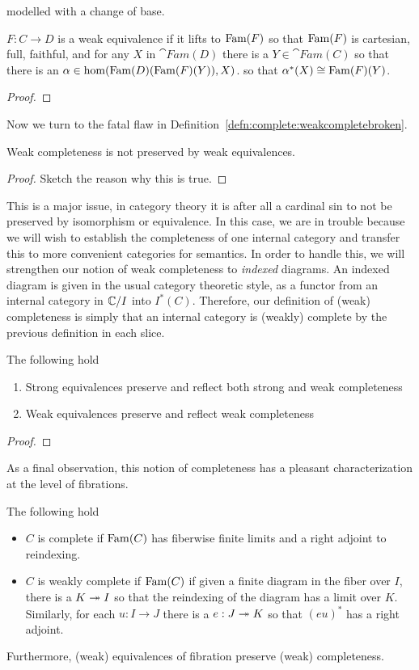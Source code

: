 modelled with a change of base. 
\begin{thm}\label{thm:complete:weakequivalencelifts}
  $F : C \to D$ is a weak equivalence if it lifts to $\operatorname{Fam}(F)$ so
  that $\operatorname{Fam}(F)$ is cartesian, full, faithful, and for any $X$ in
  $\cat{Fam}(D)$ there is a $Y \in \cat{Fam}(C)$ so that
  there is an $\alpha \in \hom(\operatorname{Fam}(D)(\operatorname{Fam}(F)(Y)), X)$. so that
  $\alpha^*(X) \cong \operatorname{Fam}(F)(Y)$.
\end{thm}
\begin{proof}
\end{proof}
Now we turn to the fatal flaw in
Definition~\ref{defn:complete:weakcompletebroken}.
\begin{thm}\label{thm:complete:weakcompletenotpreserved}
  Weak completeness is not preserved by weak equivalences.
\end{thm}
\begin{proof}
  Sketch the reason why this is true.
\end{proof}
This is a major issue, in category theory it is after all a cardinal
sin to not be preserved by isomorphism or equivalence. In this case,
we are in trouble because we will wish to establish the completeness
of one internal category and transfer this to more convenient
categories for semantics. In order to handle this, we will strengthen
our notion of weak completeness to \emph{indexed} diagrams. An indexed
diagram is given in the usual category theoretic style, as a functor
from an internal category in $\mathbb{C}/I$ into $I^*(C)$. Therefore, our
definition of (weak) completeness is simply that an internal category
is (weakly) complete by the previous definition in each slice.
\begin{thm}\label{thm:complete:preservation}
  The following hold
  \begin{enumerate}
  \item Strong equivalences preserve and reflect both strong and weak
    completeness
  \item Weak equivalences preserve and reflect weak completeness
  \end{enumerate}
\end{thm}
\begin{proof}
\end{proof}
As a final observation, this notion of completeness has a pleasant
characterization at the level of fibrations.
\begin{thm}\label{thm:complete:completefibration}
  The following hold
  \begin{itemize}
  \item $C$ is complete if $\operatorname{Fam}(C)$ has fiberwise finite limits and a
    right adjoint to reindexing.
  \item $C$ is weakly complete if $\operatorname{Fam}(C)$ if given a finite
    diagram in the fiber over $I$, there is a $K \twoheadrightarrow I$ so that the
    reindexing of the diagram has a limit over $K$. Similarly, for
    each $u : I \to J$ there is a $e : J \twoheadrightarrow K$ so that $(eu)^*$ has
    a right adjoint.
  \end{itemize}
  Furthermore, (weak) equivalences of fibration preserve (weak)
  completeness.
\end{thm}
